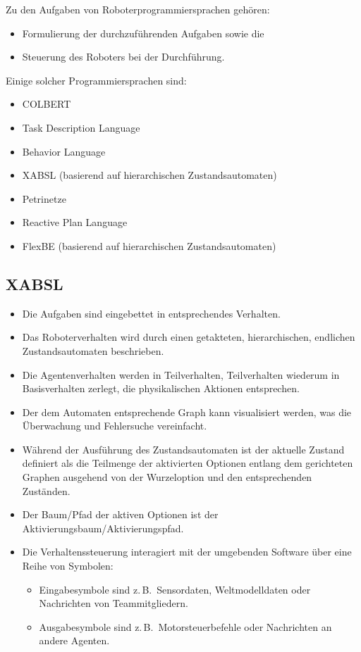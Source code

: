 \documentclass[a4paper, 11pt, accentcolor = tud3b]{tudreport}
\newcommand{\zB}{z.\,B.~}
\begin{document}
			Zu den Aufgaben von Roboterprogrammiersprachen gehören:
			\begin{itemize}
				\item Formulierung der durchzuführenden Aufgaben sowie die
				\item Steuerung des Roboters bei der Durchführung.
			\end{itemize}
		
			Einige solcher Programmiersprachen sind:
			\begin{itemize}
				\item COLBERT
				\item Task Description Language
				\item Behavior Language
				\item XABSL (basierend auf hierarchischen Zustandsautomaten)
				\item Petrinetze
				\item Reactive Plan Language
				\item FlexBE (basierend auf hierarchischen Zustandsautomaten)
			\end{itemize}

			\subsection{XABSL}
				\begin{itemize}
					\item Die Aufgaben sind eingebettet in entsprechendes Verhalten.
					\item Das Roboterverhalten wird durch einen getakteten, hierarchischen, endlichen Zustandsautomaten beschrieben.
					\item Die Agentenverhalten werden in Teilverhalten,  Teilverhalten wiederum in Basisverhalten zerlegt, die physikalischen Aktionen entsprechen.
					\item Der dem Automaten entsprechende Graph kann visualisiert werden, was die Überwachung und Fehlersuche vereinfacht.
					\item Während der Ausführung des Zustandsautomaten ist der aktuelle Zustand definiert als die Teilmenge der aktivierten Optionen entlang dem gerichteten Graphen ausgehend von der Wurzeloption und den entsprechenden Zuständen.
					\item Der Baum/Pfad der aktiven Optionen ist der Aktivierungsbaum/Aktivierungspfad.
					\item Die Verhaltenssteuerung interagiert mit der umgebenden Software über eine Reihe von Symbolen:
						\begin{itemize}
							\item Eingabesymbole sind \zB Sensordaten, Weltmodelldaten oder Nachrichten von Teammitgliedern.
							\item Ausgabesymbole sind \zB Motorsteuerbefehle oder Nachrichten an andere Agenten.
						\end{itemize}
				\end{itemize}
\end{document}
